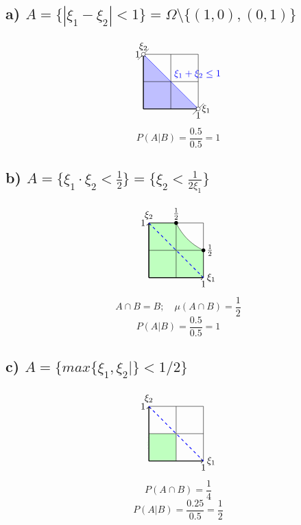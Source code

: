 \documentclass[11pt, a4paper]{article} %
\begin{document}
\subsection*{a) $A = \{|\xi_1 - \xi_2| < 1\} = \Omega \setminus \{(1,0), (0,1)\}$}
$$\begin{tikzpicture}
    \fill[blue!25] (0,0) -- (0,2) -- (2,0) -- cycle;
    \draw[thin] (0,0) grid[step=1cm] (2,2);
    \draw[thick,->] (0,0) -- (0,2) node[above] {$\xi_2$};
    \draw[thick,->] (0,0) -- (2,0) node[right] {$\xi_1$};
    \node[below] at (2,0) {$1$};
    \node[left] at (0,2) {$1$};
    \draw[blue] (0,2) -- (1,1) node[above right] {$\xi_1 + \xi_2 \le 1$} -- (2,0);
    \draw (1.8,-0.2) -- (2.2, 0.2);
    \draw (0.2,2.2) -- (-0.2, 1.8);
    \filldraw[fill=white] (0,2) circle (2pt);
    \filldraw[fill=white] (2,0) circle (2pt);
\end{tikzpicture}$$
$$P(A|B) = \frac{0.5}{0.5} = 1$$

\subsection*{b) $A = \{\xi_1 \cdot \xi_2 < \frac{1}{2}\} = \{\xi_2 < \frac{1}{2\xi_1}\}$}
$$\begin{tikzpicture}
    \filldraw[fill=green!25, draw=black] 
				(1,2) -- plot[%
					scale=2,
					samples=100,
					domain=0.5:1,
				] (\x,{0.5/(\x)}) -- (2,1) -- (2,0) -- (0,0) -- (0,2) -- cycle;
    \draw[thin] (0,0) grid[step=1cm] (2,2);
    \draw[thick,->] (0,0) -- (0,2) node[above] {$\xi_2$};
    \draw[thick,->] (0,0) -- (2,0) node[right] {$\xi_1$};
    \node[below] at (2,0) {$1$};
    \node[left] at (0,2) {$1$};
    \draw[blue, thick, dashed] (0,2) -- (1,1) -- (2,0);
    \fill (2,1) circle (2pt) node[right] {$\frac{1}{2}$};
    \fill (1,2) circle (2pt) node[above] {$\frac{1}{2}$};
\end{tikzpicture}$$
$$A\cap B = B;\quad \mu(A\cap B) = \frac{1}{2}$$
$$P(A|B) = \frac{0.5}{0.5} = 1$$

\subsection*{c) $A = \{max\{\xi_1, \xi_2|\} < 1/2\}$}
$$\begin{tikzpicture}
    \fill[green!25] (0,0) -- (0,1) node[below] {$\frac{1}{2}$} -- (1,1) -- (1,0) -- cycle;
    \draw[thin] (0,0) grid[step=1cm] (2,2);
    \draw[thick,->] (0,0) -- (0,2) node[above] {$\xi_2$};
    \draw[thick,->] (0,0) -- (2,0) node[right] {$\xi_1$};
    \node[below] at (2,0) {$1$};
    \node[left] at (0,2) {$1$};
    \draw[blue, thick, dashed] (0,2) -- (1,1) -- (2,0);
\end{tikzpicture}$$
$$P(A \cap B) = \frac{1}{4}$$
$$P(A|B) = \frac{0.25}{0.5} = \frac{1}{2}$$
\end{document}
